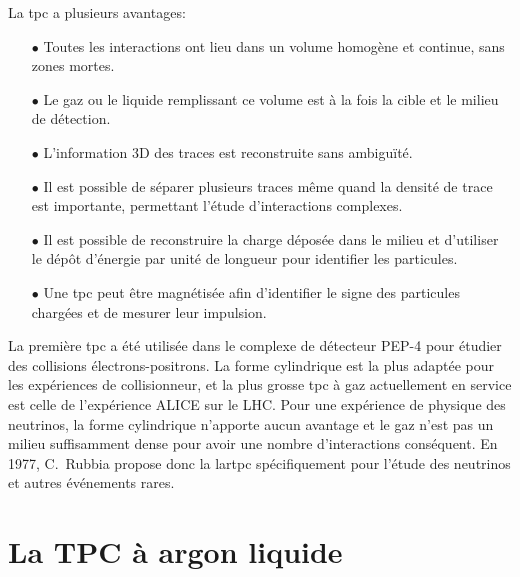     La \gls{tpc} a plusieurs avantages:
    \begin{itemize}
      \item[$\bullet$] Toutes les interactions ont lieu dans un volume homogène et continue, sans zones mortes.
      \item[$\bullet$] Le gaz ou le liquide remplissant ce volume est à la fois la cible et le milieu de détection.
      \item[$\bullet$] L'information 3D des traces est reconstruite sans ambiguïté.
      \item[$\bullet$] Il est possible de séparer plusieurs traces même quand la densité de trace est importante, permettant l'étude d'interactions complexes.
      \item[$\bullet$] Il est possible de reconstruire la charge déposée dans le milieu et d'utiliser le dépôt d'énergie par unité de longueur pour identifier les particules.
      \item[$\bullet$] Une \gls{tpc} peut être magnétisée afin d'identifier le signe des particules chargées et de mesurer leur impulsion.
    \end{itemize}
    
    La première \gls{tpc} a été utilisée dans le complexe de détecteur PEP-4 pour étudier des collisions électrons-positrons. La forme cylindrique est la plus adaptée pour les expériences de collisionneur, et la plus grosse \gls{tpc} à gaz actuellement en service est celle de l'expérience ALICE sur le LHC. Pour une expérience de physique des neutrinos, la forme cylindrique n'apporte aucun avantage et le gaz n'est pas un milieu suffisamment dense pour avoir une nombre d'interactions conséquent. En 1977, C.~Rubbia propose donc la \acrfull{lartpc} \cite{Rubbia1977} spécifiquement pour l'étude des neutrinos et autres événements rares.
    
  \section{La TPC à argon liquide}\label{sec::lartpc}
    
